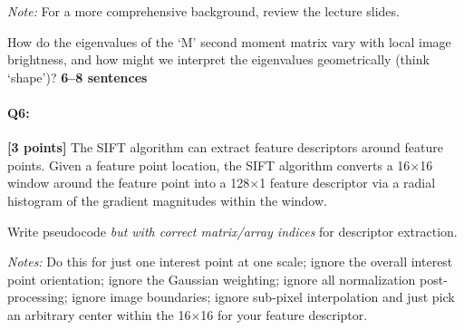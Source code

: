 \documentclass[11pt]{article}
\begin{document}
\textit{Note:} For a more comprehensive background, review the lecture slides.

\begin{tcolorbox}[colback=orange!5!white,colframe=orange!75!black]
How do the eigenvalues of the `M' second moment matrix vary with local image brightness, and how might we interpret the eigenvalues geometrically (think `shape')? \textbf{6--8 sentences}
\end{tcolorbox}


\pagebreak
\paragraph{Q6:} \textbf{[3 points]}
The SIFT algorithm can extract feature descriptors around feature points. Given a feature point location, the SIFT algorithm converts a 16$\times$16 window around the feature point into a 128$\times$1 feature descriptor via a radial histogram of the gradient magnitudes within the window.


\begin{tcolorbox}[colback=orange!5!white,colframe=orange!75!black]
Write pseudocode \emph{but with correct matrix/array indices} for descriptor extraction.

\emph{Notes:} Do this for just one interest point at one scale; ignore the overall interest point orientation; ignore the Gaussian weighting; ignore all normalization post-processing; ignore image boundaries; ignore sub-pixel interpolation and just pick an arbitrary center within the 16$\times$16 for your feature descriptor.
\end{tcolorbox}
\end{document}
